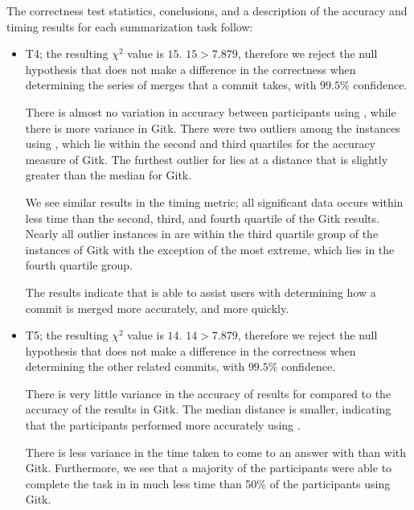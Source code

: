 The correctness test statistics, conclusions, and a description of the
accuracy and timing results for each summarization task follow:

\begin{itemize}

  \item

    T4; the resulting $\chi^2$ value is $15$. $15 > 7.879$, therefore we
    reject the null hypothesis that \tool does not make a difference in
    the correctness when determining the series of merges that a commit
    takes, with $99.5\%$ confidence.

    There is almost no variation in accuracy between participants using
    \tool, while there is more variance in Gitk. There were two outliers
    among the instances using \tool, which lie within the second and
    third quartiles for the accuracy measure of Gitk. The furthest
    outlier for \tool lies at a distance that is slightly greater than
    the median for Gitk.

    We see similar results in the timing metric; all significant data
    occurs within less time than the second, third, and fourth quartile
    of the Gitk results. Nearly all outlier instances in \tool are
    within the third quartile group of the instances of Gitk with the
    exception of the most extreme, which lies in the fourth quartile
    group.

    The results indicate that \tool is able to assist users with
    determining how a commit is merged more accurately, and more
    quickly.

  \item

    T5; the resulting $\chi^2$ value is $14$. $14 > 7.879$, therefore we
    reject the null hypothesis that \tool does not make a difference in
    the correctness when determining the other related commits, with
    $99.5\%$ confidence.

    There is very little variance in the accuracy of results for \tool
    compared to the accuracy of the results in Gitk. The median distance
    is smaller, indicating that the participants performed more
    accurately using \tool.

    There is less variance in the time taken to come to an answer with
    \tool than with Gitk. Furthermore, we see that a majority of the
    participants were able to complete the task in \tool in much less
    time than 50\% of the participants using Gitk.


\end{itemize}
